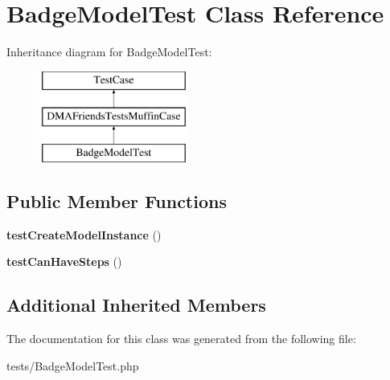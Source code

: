 \hypertarget{classBadgeModelTest}{\section{Badge\-Model\-Test Class Reference}
\label{classBadgeModelTest}
}
Inheritance diagram for Badge\-Model\-Test\-:\begin{figure}[H]
\begin{center}
\leavevmode
\includegraphics[height=3.000000cm]{de/dfe/classBadgeModelTest}
\end{center}
\end{figure}
\subsection*{Public Member Functions}
\begin{DoxyCompactItemize}
\item 
\hypertarget{classBadgeModelTest_a1eb49f5ed8ee3462a92ad5701945f11e}{{\bfseries test\-Create\-Model\-Instance} ()}\label{classBadgeModelTest_a1eb49f5ed8ee3462a92ad5701945f11e}

\item 
\hypertarget{classBadgeModelTest_a09875cc0b88c068960fdc749f2c424de}{{\bfseries test\-Can\-Have\-Steps} ()}\label{classBadgeModelTest_a09875cc0b88c068960fdc749f2c424de}

\end{DoxyCompactItemize}
\subsection*{Additional Inherited Members}


The documentation for this class was generated from the following file\-:\begin{DoxyCompactItemize}
\item 
tests/Badge\-Model\-Test.\-php\end{DoxyCompactItemize}
